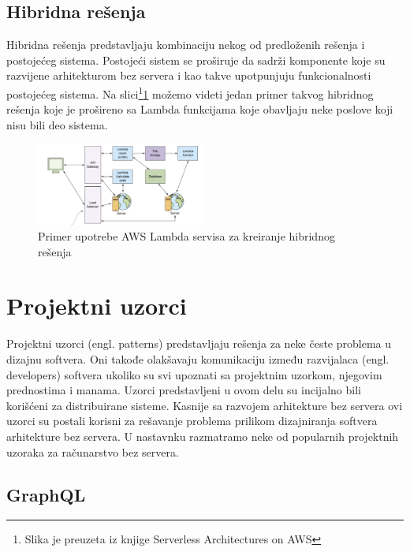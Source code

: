 \documentclass[12pt,oneside]{memoir}
\begin{document}
\subsection{Hibridna rešenja}

Hibridna rešenja predstavljaju kombinaciju nekog od predloženih rešenja i postojećeg sistema. Postojeći sistem se proširuje da sadrži komponente koje su razvijene arhitekturom bez servera i kao takve upotpunjuju funkcionalnosti postojećeg sistema. Na slici\footnote{Slika je preuzeta iz knjige Serverless Architectures on AWS}\ref{fig:HibridnoResenje} možemo videti jedan primer takvog hibridnog rešenja koje je prošireno sa Lambda funkcijama koje obavljaju neke poslove koji nisu bili deo sistema.

\begin{figure}[!ht]
  \centering
  \includegraphics[width=0.5\textwidth]{Slika 10.png}
  \caption{Primer upotrebe AWS Lambda servisa za kreiranje hibridnog rešenja}
  \label{fig:HibridnoResenje}
\end{figure}

\section{Projektni uzorci}

Projektni uzorci (engl. patterns) predstavljaju rešenja za neke česte problema u dizajnu softvera. Oni takođe olakšavaju komunikaciju između razvijalaca (engl. developers) softvera ukoliko su svi upoznati sa projektnim uzorkom, njegovim prednostima i manama. Uzorci predstavljeni u ovom delu su incijalno bili korišćeni za distribuirane sisteme. Kasnije sa razvojem arhitekture bez servera ovi uzorci su postali korisni za rešavanje problema prilikom dizajniranja softvera arhitekture bez servera\cite{sa}. U nastavnku razmatramo neke od popularnih projektnih uzoraka za računarstvo bez servera.

\subsection{GraphQL}
\end{document}
